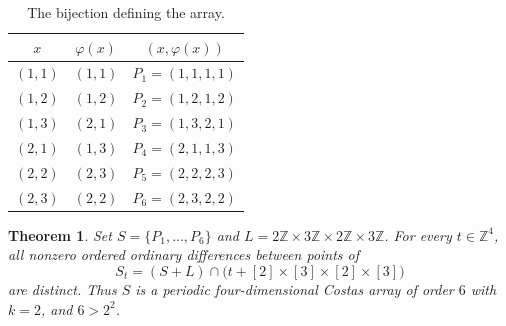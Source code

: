 \documentclass[11pt,a4paper]{article}
\newtheorem{theorem}{Theorem}
\newcommand{\Z}{\mathbb Z}
\begin{document}
\begin{table}[ht]
\centering
\begin{tabular}{ccc}
\toprule
$x$ & $\varphi(x)$ & $(x,\varphi(x))$\\
\midrule
$(1,1)$ & $(1,1)$ & $P_1=(1,1,1,1)$\\
$(1,2)$ & $(1,2)$ & $P_2=(1,2,1,2)$\\
$(1,3)$ & $(2,1)$ & $P_3=(1,3,2,1)$\\
$(2,1)$ & $(1,3)$ & $P_4=(2,1,1,3)$\\
$(2,2)$ & $(2,3)$ & $P_5=(2,2,2,3)$\\
$(2,3)$ & $(2,2)$ & $P_6=(2,3,2,2)$\\
\bottomrule
\end{tabular}
\caption{The bijection defining the array.}
\label{tab:array}
\end{table}

\begin{theorem}\label{thm:main}
Set $S=\{P_1,\ldots,P_6\}$ and $L=2\Z\times3\Z\times2\Z\times3\Z$.
For every $t\in\Z^4$, all nonzero ordered ordinary differences between
points of
\[
 S_t=(S+L)\cap\bigl(t+[2]\times[3]\times[2]\times[3]\bigr)
\]
are distinct. Thus $S$ is a periodic four-dimensional Costas array of
order $6$ with $k=2$, and $6>2^2$.
\end{theorem}
\end{document}
